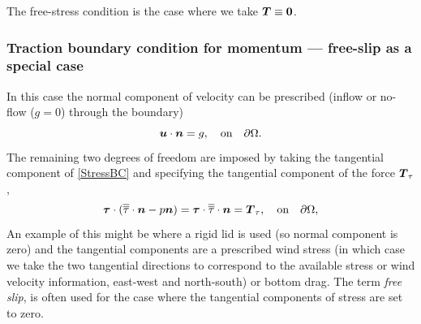The free-stress condition is the case where we take ${\mbox{\boldmath$T$}}\equiv{\mbox{\boldmath$0$}}$.

\subsubsection{Traction boundary condition for momentum --- free-slip as a special case}\label{sec:bc_vector_traction}
In this case the normal component of velocity can be prescribed (\eg inflow or
no-flow ($g=0$) through the boundary)
\begin{equation}
{\mbox{\boldmath$u$}}\cdot{\mbox{\boldmath$n$}} = g,\quad \textrm{on}\quad \partial\Omega.
\label{normal_flow_condition}
\end{equation}
The remaining two degrees of freedom are imposed by taking the
tangential component of \eqref{StressBC} and specifying the tangential component
of the force ${\mbox{\boldmath$T$}}_{\tau}$, \ie
\begin{equation*}
{\mbox{\boldmath$\tau$}}\cdot(\overline{\overline{\tau}}\cdot{\mbox{\boldmath$n$}} - p{\mbox{\boldmath$n$}}) = {\mbox{\boldmath$\tau$}}\cdot\overline{\overline{\tau}}\cdot{\mbox{\boldmath$n$}} = {\mbox{\boldmath$T$}}_{\tau},\quad \textrm{on}\quad \partial\Omega,
\end{equation*}
An example of this might be where a rigid lid is used (so normal component is zero)
and the tangential components are a prescribed wind stress (in which case we take
the two tangential directions to correspond to the available stress or wind velocity
information, \ie east-west and north-south) or bottom drag. The term
\emph{free slip}, is often used for the case
where the tangential components of stress are set to zero.

